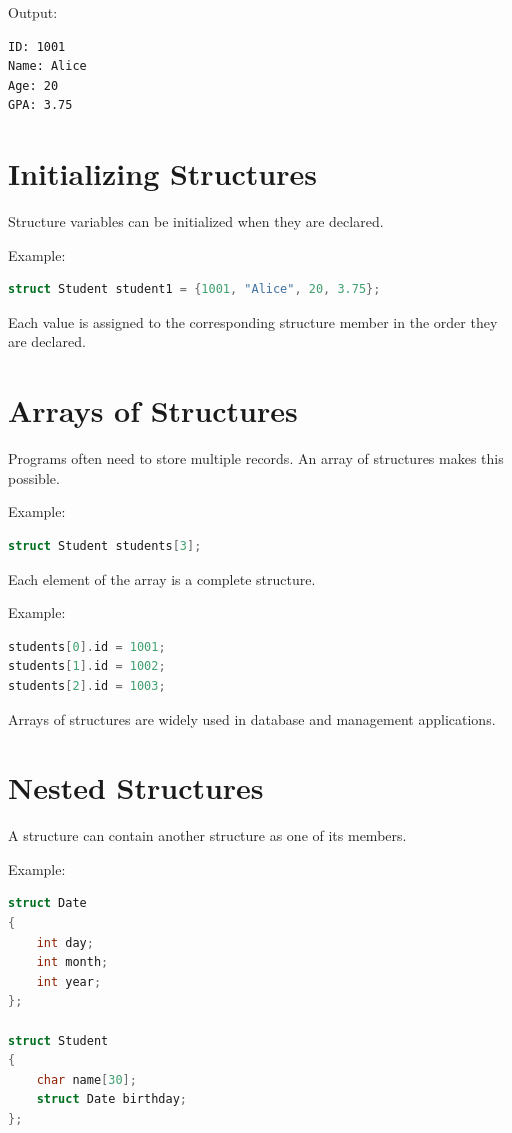 \documentclass[12pt,openany]{book}
\begin{document}
Output:

\begin{lstlisting}
ID: 1001
Name: Alice
Age: 20
GPA: 3.75
\end{lstlisting}
\section{Initializing Structures}

Structure variables can be initialized when they are declared.

Example:

\begin{lstlisting}[language=C]
struct Student student1 = {1001, "Alice", 20, 3.75};
\end{lstlisting}

Each value is assigned to the corresponding structure member in the order they are declared.

\section{Arrays of Structures}

Programs often need to store multiple records. An array of structures makes this possible.

Example:

\begin{lstlisting}[language=C]
struct Student students[3];
\end{lstlisting}

Each element of the array is a complete structure.

Example:

\begin{lstlisting}[language=C]
students[0].id = 1001;
students[1].id = 1002;
students[2].id = 1003;
\end{lstlisting}

Arrays of structures are widely used in database and management applications.

\section{Nested Structures}

A structure can contain another structure as one of its members.

Example:

\begin{lstlisting}[language=C]
struct Date
{
    int day;
    int month;
    int year;
};

struct Student
{
    char name[30];
    struct Date birthday;
};
\end{lstlisting}
\end{document}
